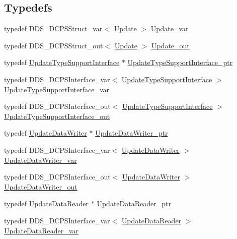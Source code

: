 \subsection*{Typedefs}
\begin{DoxyCompactItemize}
\item 
typedef DDS\_\-DCPSStruct\_\-var$<$ \hyperlink{structKnowledge_1_1Update}{Update} $>$ \hyperlink{namespaceKnowledge_a89381a78760c54e9d5d5021e068bfb45}{Update\_\-var}
\item 
typedef DDS\_\-DCPSStruct\_\-out$<$ \hyperlink{structKnowledge_1_1Update}{Update} $>$ \hyperlink{namespaceKnowledge_ad202db76833fd4d8d342cb77dc4ea214}{Update\_\-out}
\item 
typedef \hyperlink{classKnowledge_1_1UpdateTypeSupportInterface}{UpdateTypeSupportInterface} $\ast$ \hyperlink{namespaceKnowledge_a4e2a17714bd1ef8a9dac5ce745964659}{UpdateTypeSupportInterface\_\-ptr}
\item 
typedef DDS\_\-DCPSInterface\_\-var$<$ \hyperlink{classKnowledge_1_1UpdateTypeSupportInterface}{UpdateTypeSupportInterface} $>$ \hyperlink{namespaceKnowledge_a933872871f686a514362b32892d09283}{UpdateTypeSupportInterface\_\-var}
\item 
typedef DDS\_\-DCPSInterface\_\-out$<$ \hyperlink{classKnowledge_1_1UpdateTypeSupportInterface}{UpdateTypeSupportInterface} $>$ \hyperlink{namespaceKnowledge_ae6f2da65b9161a11f319e8520fa965c3}{UpdateTypeSupportInterface\_\-out}
\item 
typedef \hyperlink{classKnowledge_1_1UpdateDataWriter}{UpdateDataWriter} $\ast$ \hyperlink{namespaceKnowledge_aa32f34fdd4439201a0163b9e6a6713d7}{UpdateDataWriter\_\-ptr}
\item 
typedef DDS\_\-DCPSInterface\_\-var$<$ \hyperlink{classKnowledge_1_1UpdateDataWriter}{UpdateDataWriter} $>$ \hyperlink{namespaceKnowledge_a560a08cffb536bdec78ec681bd76c4b5}{UpdateDataWriter\_\-var}
\item 
typedef DDS\_\-DCPSInterface\_\-out$<$ \hyperlink{classKnowledge_1_1UpdateDataWriter}{UpdateDataWriter} $>$ \hyperlink{namespaceKnowledge_a400a4e00825d1958022850074dd293de}{UpdateDataWriter\_\-out}
\item 
typedef \hyperlink{classKnowledge_1_1UpdateDataReader}{UpdateDataReader} $\ast$ \hyperlink{namespaceKnowledge_a6c868767b12725ee116fae580947c9d9}{UpdateDataReader\_\-ptr}
\item 
typedef DDS\_\-DCPSInterface\_\-var$<$ \hyperlink{classKnowledge_1_1UpdateDataReader}{UpdateDataReader} $>$ \hyperlink{namespaceKnowledge_acbf12106aaac4bdb65b120d8c2f38757}{UpdateDataReader\_\-var}

\end{DoxyCompactItemize}
